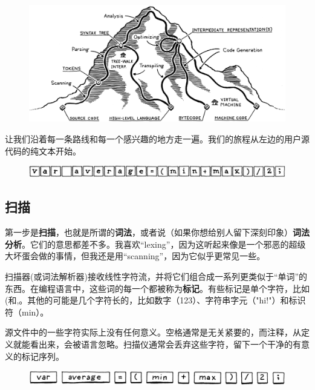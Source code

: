 \documentclass[cn,11pt,chinese]{elegantbook}
\begin{document}
\begin{figure}[htbp]
  \centering
  \includegraphics[width=\textwidth]{image/a-map-of-the-territory/mountain.png}
\end{figure}

让我们沿着每一条路线和每一个感兴趣的地方走一遍。我们的旅程从左边的用户源代码的纯文本开始。

\begin{figure}[htbp]
  \centering
  \includegraphics[width=\textwidth]{image/a-map-of-the-territory/string.png}
\end{figure}

\subsection{扫描}

第一步是\textbf{扫描}，也就是所谓的\textbf{词法}，或者说（如果你想给别人留下深刻印象）\textbf{词法分析}。它们的意思都差不多。我喜欢“lexing”，因为这听起来像是一个邪恶的超级大坏蛋会做的事情，但我还是用“scanning”，因为它似乎更常见一些。

扫描器(或词法解析器)接收线性字符流，并将它们组合成一系列更类似于“单词”的东西。在编程语言中，这些词的每一个都被称为\textbf{标记}。有些标记是单个字符，比如(和,。其他的可能是几个字符长的，比如数字（123）、字符串字元（"hi!"）和标识符（min）。

源文件中的一些字符实际上没有任何意义。空格通常是无关紧要的，而注释，从定义就能看出来，会被语言忽略。扫描仪通常会丢弃这些字符，留下一个干净的有意义的标记序列。

\begin{figure}[htbp]
  \centering
  \includegraphics[width=\textwidth]{image/a-map-of-the-territory/tokens.png}
\end{figure}
\end{document}
